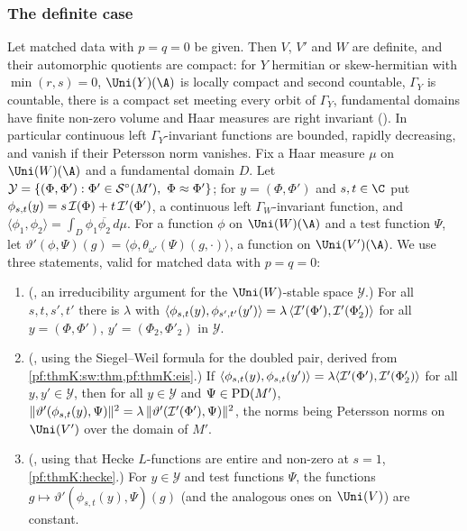 \subsubsection{The definite case}\label{sec:pf:thmK:polzero}
Let matched data with $p=q=0$ be given. Then $V$, $V'$ and $W$ are definite, and their automorphic quotients are compact:
for $Y$ hermitian or skew-hermitian with $\min(r,s)=0$, $\Uni(Y)(\A)$ is locally compact and second countable, $\Gamma_Y$ is
countable, there is a compact set meeting every orbit of $\Gamma_Y$, fundamental domains have finite non-zero volume and Haar
measures are right invariant (). In particular continuous left
$\Gamma_Y$-invariant functions are bounded, rapidly decreasing, and vanish if their Petersson norm vanishes. Fix a Haar
measure $\mu$ on $\Uni(W)(\A)$ and a fundamental domain $D$. Let $\mathcal Y=\{(\Phi,\Phi'):\Phi'\in\mathcal{S}^{\circ}(M'),\
\Phi\approx\Phi'\}$; for $y=(\Phi,\Phi')$ and $s,t\in\C$ put $\phi_{s,t}(y)=s\,\mathcal{I}(\Phi)+t\,\mathcal{I}'(\Phi')$, a continuous
left $\Gamma_W$-invariant function, and $\langle\phi_1,\phi_2\rangle=\int_D\phi_1\overline{\phi_2}\,d\mu$. For a function
$\phi$ on $\Uni(W)(\A)$ and a test function $\Psi$, let $\vartheta'(\phi,\Psi)(g)=\langle\phi,\theta_{\omega'}(\Psi)(g,
\cdot)\rangle$, a function on $\Uni(V')(\A)$. We use three statements, valid for matched data with $p=q=0$:
\begin{enumerate}[label=(P\arabic*)]
\item\label{pf:thmK:P:herm} (, an irreducibility argument for the
$\Uni(W)$-stable space $\mathcal Y$.) For all $s,t,s',t'$ there is $\lambda$ with $\langle\phi_{s,t}(y),\phi_{s',t'}(y')
\rangle=\lambda\,\langle\mathcal{I}'(\Phi'),\mathcal{I}'(\Phi'_2)\rangle$ for all $y=(\Phi,\Phi')$, $y'=(\Phi_2,\Phi'_2)$ in $\mathcal Y$.
\item\label{pf:thmK:P:coef} (\lref{GlobalTheory.ThK.Dbl.coefLine_of}, using the Siegel--Weil formula for the doubled
pair, derived from \cref{pf:thmK:sw:thm,pf:thmK:eis}.) If $\langle\phi_{s,t}(y),\phi_{s,t}(y')\rangle=\lambda\langle
\mathcal{I}'(\Phi'),\mathcal{I}'(\Phi'_2)\rangle$ for all $y,y'\in\mathcal Y$, then for all $y\in\mathcal Y$ and $\Psi\in\operatorname{PD}(M')$,
$\|\vartheta'(\phi_{s,t}(y),\Psi)\|^2=\lambda\,\|\vartheta'(\mathcal{I}'(\Phi'),\Psi)\|^2$, the norms being Petersson norms on
$\Uni(V')$ over the domain of $M'$.
\item\label{pf:thmK:P:const} (, using that Hecke $L$-functions are entire and
non-zero at $s=1$, \cref{pf:thmK:hecke}.) For $y\in\mathcal Y$ and test functions $\Psi$, the functions
$g\mapsto\vartheta'(\phi_{s,t}(y),\Psi)(g)$ (and the analogous ones on $\Uni(V)$) are constant.
\end{enumerate}

